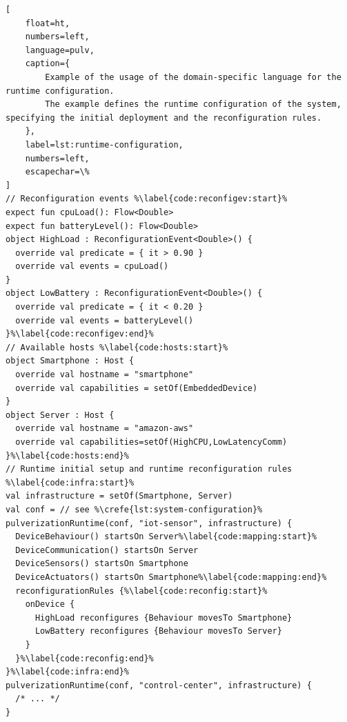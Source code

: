 \documentclass[conference]{IEEEtran}
\begin{document}
\begin{lstlisting}[
    float=ht,
    numbers=left,
    language=pulv,
    caption={
        Example of the usage of the domain-specific language for the runtime configuration.
        The example defines the runtime configuration of the system, specifying the initial deployment and the reconfiguration rules.
    },
    label=lst:runtime-configuration,
    numbers=left,
    escapechar=\%
]
// Reconfiguration events %\label{code:reconfigev:start}%
expect fun cpuLoad(): Flow<Double>
expect fun batteryLevel(): Flow<Double>
object HighLoad : ReconfigurationEvent<Double>() {
  override val predicate = { it > 0.90 }
  override val events = cpuLoad()
}
object LowBattery : ReconfigurationEvent<Double>() {
  override val predicate = { it < 0.20 }
  override val events = batteryLevel()
}%\label{code:reconfigev:end}%
// Available hosts %\label{code:hosts:start}%
object Smartphone : Host {
  override val hostname = "smartphone"
  override val capabilities = setOf(EmbeddedDevice)
}
object Server : Host {
  override val hostname = "amazon-aws"
  override val capabilities=setOf(HighCPU,LowLatencyComm)
}%\label{code:hosts:end}%
// Runtime initial setup and runtime reconfiguration rules %\label{code:infra:start}%
val infrastructure = setOf(Smartphone, Server)
val conf = // see %\crefe{lst:system-configuration}%
pulverizationRuntime(conf, "iot-sensor", infrastructure) {
  DeviceBehaviour() startsOn Server%\label{code:mapping:start}%
  DeviceCommunication() startsOn Server
  DeviceSensors() startsOn Smartphone
  DeviceActuators() startsOn Smartphone%\label{code:mapping:end}%
  reconfigurationRules {%\label{code:reconfig:start}%
    onDevice {
      HighLoad reconfigures {Behaviour movesTo Smartphone}
      LowBattery reconfigures {Behaviour movesTo Server}
    }
  }%\label{code:reconfig:end}%
}%\label{code:infra:end}%
pulverizationRuntime(conf, "control-center", infrastructure) {
  /* ... */
}
\end{lstlisting}

\end{document}
